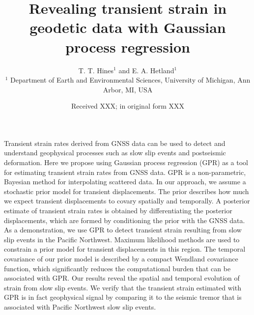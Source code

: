 \documentclass[extra,mreferee]{gji}
\title[Transient strain in geodetic data]
      {Revealing transient strain in geodetic data with Gaussian process regression}
\author[T. T. Hines and E. A. Hetland]
       {T. T. Hines$^1$ and E. A. Hetland$^1$ \\
        $^1$ Department of Earth and Environmental Sciences, University of Michigan, Ann Arbor, MI, USA}
\date{Received XXX; in original form XXX}
\begin{document}
\label{firstpage}

\maketitle

\newcommand{\pos}{\vec{x}} %
\newcommand{\data}{\mitbf{d}} %
\newcommand{\post}{\hat{u}} %
\newcommand{\points}{\mitbf{P}} %
\newcommand{\strain}{\dot\varepsilon} %
\newcommand{\E}[1]{\mathrm{E}\left[ #1 \right]} %
\newcommand{\Cov}[1]{\mathrm{Cov}\left[ #1 \right]} %
\newcommand{\e}{\mathrm{e}} %
\newcommand{\n}{\mathrm{n}} %
\newcommand{\G}{\mitbf{G}} %
\newcommand{\zeros}{\mitbf{0}} %
\newcommand{\eye}{\mitbf{I}} %

\begin{summary}


Transient strain rates derived from GNSS data can be used to detect
and understand geophysical processes such as slow slip events and
postseismic deformation. Here we propose using Gaussian process
regression (GPR) as a tool for estimating transient strain rates from
GNSS data. GPR is a non-parametric, Bayesian method for interpolating
scattered data. In our approach, we assume a stochastic prior model
for transient displacements. The prior describes how much we expect
transient displacements to covary spatially and temporally. A
posterior estimate of transient strain rates is obtained by
differentiating the posterior displacements, which are formed by
conditioning the prior with the GNSS data. As a demonstration, we use
GPR to detect transient strain resulting from slow slip events in the
Pacific Northwest. Maximum likelihood methods are used to constrain a
prior model for transient displacements in this region. The temporal
covariance of our prior model is described by a compact Wendland
covariance function, which significantly reduces the computational
burden that can be associated with GPR. Our results reveal the spatial
and temporal evolution of strain from slow slip events. We verify that
the transient strain estimated with GPR is in fact geophysical signal
by comparing it to the seismic tremor that is associated with Pacific
Northwest slow slip events.

\end{summary}
\end{document}
